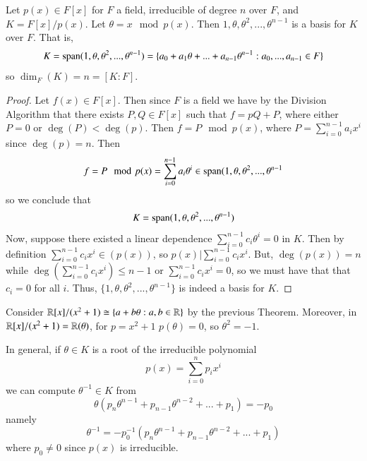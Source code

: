 \documentclass[12pt, a4paper, oneside, openright, titlepage]{book}
\begin{document}
\begin{thm}\label{thm:vectext}
    Let $p(x) \in F[x]$ for $F$ a field, irreducible of degree $n$ over $F$, and $K = F[x]/p(x)$. Let $\theta = x\mod p(x)$. Then $1,\theta,\theta^2,...,\theta^{n-1}$ is a basis for $K$ over $F$. That is, \begin{equation}
        K = \operatorname{span}(1,\theta,\theta^2,...,\theta^{n-1}) = \{a_0+a_1\theta+...+a_{n-1}\theta^{n-1}:a_0,...,a_{n-1} \in F\}
    \end{equation}
    so $\dim_F(K) = n = [K:F]$.
\end{thm}
\begin{proof}
    Let $f(x) \in F[x]$. Then since $F$ is a field we have by the Division Algorithm that there exists $P,Q \in F[x]$ such that $f = pQ+P$, where either $P = 0$ or $\deg(P) <\deg(p)$. Then $f = P\mod p(x)$, where $P = \sum_{i=0}^{n-1}a_ix^i$ since $\deg(p) = n$. Then $$f = P\mod p(x) = \sum_{i=0}^{n-1}a_i\theta^i \in \operatorname{span}(1,\theta,\theta^2,...,\theta^{n-1}$$ so we conclude that $$K = \operatorname{span}(1,\theta,\theta^2,...,\theta^{n-1})$$
    Now, suppose there existed a linear dependence $\sum_{i=0}^{n-1}c_i\theta^i = 0$ in $K$. Then by definition $\sum_{i=0}^{n-1}c_ix^i \in (p(x))$, so $p(x)\vert \sum_{i=0}^{n-1}c_ix^i$. But, $\deg(p(x)) = n$ while $\deg\left(\sum_{i=0}^{n-1}c_ix^i\right) \leq n-1$ or $\sum_{i=0}^{n-1}c_ix^i = 0$, so we must have that that $c_i = 0$ for all $i$. Thus, $\{1,\theta,\theta^2,...,\theta^{n-1}\}$ is indeed a basis for $K$. 
\end{proof}


\begin{eg}
    Consider $\mathbb R[x]/(x^2+1) \cong \{a+b\theta:a,b \in \mathbb R\}$ by the previous Theorem. Moreover, in $\mathbb R[x]/(x^2+1) = \mathbb R(\theta)$, for $p = x^2+1$ $p(\theta) = 0$, so $\theta^2 = -1$.
\end{eg}


\begin{eg}
    In general, if $\theta \in K$ is a root of the irreducible polynomial \begin{equation*}
        p(x) = \sum_{i=0}^np_ix^i
    \end{equation*}
    we can compute $\theta^{-1} \in K$ from \begin{equation*}
        \theta(p_n\theta^{n-1}+p_{n-1}\theta^{n-2}+...+p_1) = -p_0
    \end{equation*}
    namely \begin{equation*}
        \theta^{-1} = -p_0^{-1}(p_n\theta^{n-1}+p_{n-1}\theta^{n-2}+...+p_1)
    \end{equation*}
    where $p_0 \neq 0$ since $p(x)$ is irreducible.
\end{eg}
\end{document}
